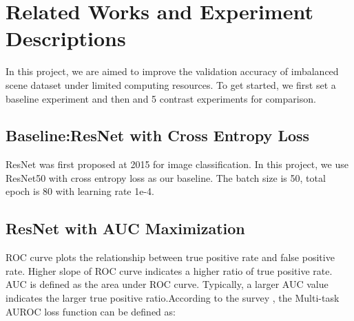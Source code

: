 \documentclass[10pt,twocolumn,letterpaper]{article}
\begin{document}
\section{Related Works and Experiment Descriptions}
In this project, we are aimed to improve the validation accuracy of imbalanced scene dataset under limited computing resources. To get started, we first set a baseline experiment and then and 5 contrast experiments for comparison.
\subsection{Baseline:ResNet with Cross Entropy Loss}
ResNet \cite{resnet} was first proposed at 2015 for image classification. In this project, we use ResNet50 with cross entropy loss as our baseline. The batch size is 50, total epoch is 80 with learning rate 1e-4. 
\subsection{ResNet with AUC Maximization}
ROC curve plots the relationship between true positive rate and false positive rate. Higher slope of ROC curve indicates a higher ratio of true positive rate. AUC is defined as the area under ROC curve. Typically, a larger AUC value indicates the larger true positive ratio.According to the survey \cite{yang2022algorithmic}, the Multi-task AUROC loss function can be defined as:
\end{document}

